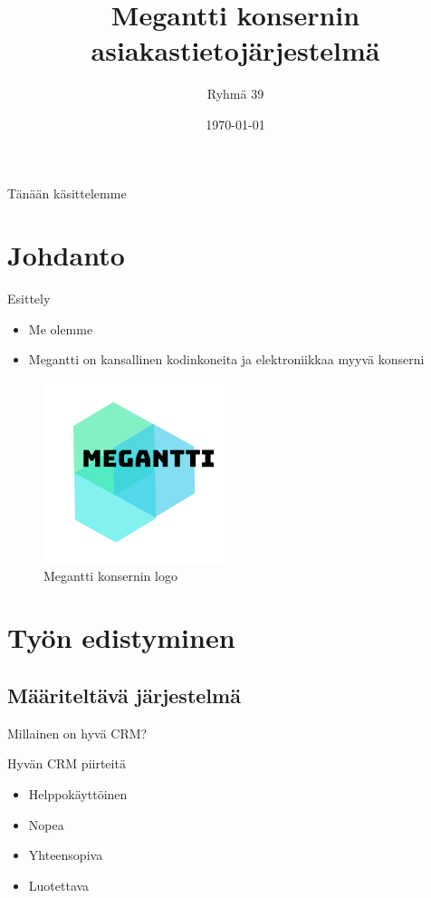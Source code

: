 \documentclass{beamer}
\title[JOTU-2019 Megantti]{Megantti konsernin asiakastietojärjestelmä}
\author{Ryhmä 39}
\institute{Tampereen Teknillinen Yliopisto}
\date{\today}
\begin{document}
\begin{frame}
  \titlepage
\end{frame}

\begin{frame}{Tänään käsittelemme}
	\tableofcontents[pausesections]
\end{frame}

\section{Johdanto}

\begin{frame}{Esittely}
\begin{itemize}
  \item<1-> Me olemme
  \item<2-> Megantti on kansallinen kodinkoneita ja elektroniikkaa myyvä konserni
\end{itemize}

\begin{figure}
\includegraphics[scale=1.0]{../megantti.png}
	\caption{Megantti konsernin logo}
\end{figure}

\end{frame}

\section{Työn edistyminen}


\subsection{Määriteltävä järjestelmä}

\begin{frame}{Millainen on hyvä CRM?}

Hyvän CRM piirteitä

	\begin{itemize}
		\item<2-> Helppokäyttöinen
		\item<3-> Nopea
		\item<4-> Yhteensopiva
		\item<5-> Luotettava
	\end{itemize}
\end{frame}
\end{document}
